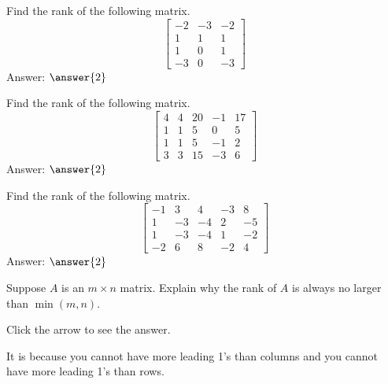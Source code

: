 \documentclass{ximera}
\begin{document}
\begin{problem}\label{prb:2.52} Find the rank of the following matrix.
\begin{equation*}
\left[
\begin{array}{rrr}
-2 & -3 & -2 \\
1 & 1 & 1 \\
1 & 0 & 1 \\
-3 & 0 & -3
\end{array}
\right]
\end{equation*}
Answer: $\answer{2}$
\end{problem}

\begin{problem}\label{prb:2.53} Find the rank of the following matrix.
\begin{equation*}
\left[
\begin{array}{rrrrr}
4 & 4 & 20 & -1 & 17 \\
1 & 1 & 5 & 0 & 5 \\
1 & 1 & 5 & -1 & 2 \\
3 & 3 & 15 & -3 & 6
\end{array}
\right]
\end{equation*}
Answer: $\answer{2}$
\end{problem}

\begin{problem}\label{prb:2.54} Find the rank of the following matrix.
\begin{equation*}
\left[
\begin{array}{rrrrr}
-1 & 3 & 4 & -3 & 8 \\
1 & -3 & -4 & 2 & -5 \\
1 & -3 & -4 & 1 & -2 \\
-2 & 6 & 8 & -2 & 4
\end{array}
 \right]
\end{equation*}
Answer: $\answer{2}$
\end{problem}

\begin{problem}\label{prb:2.55} Suppose $A$ is an $m\times n$ matrix. Explain why the rank of $A$ is
always no larger than $\min \left( m,n\right).$

Click the arrow to see the answer. 
\begin{expandable}
It is because you cannot
have more leading 1's than columns and you cannot have more leading 1's than rows.
\end{expandable}
\end{problem}
\end{document}
